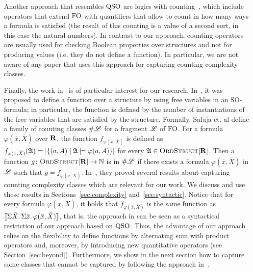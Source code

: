 Another approach that resembles ${\rm QSO}$ are logics with counting~\cite{IL90,E97,GG98,L04}, which include operators that extend ${\rm FO}$ with quantifiers that allow to count in how many ways a formula  is satisfied (the result of this counting is a value of a second sort, in this case the  natural numbers). 
In contrast to our approach, counting operators are usually used for checking Boolean properties over structures and not for producing values (i.e. they do not define a function).
In particular, we are not aware of any paper that uses this approach for capturing counting complexity classes.

Finally, the work in~\cite{SalujaST95,ComptonG96,0001HKV16} is of particular interest for our research. 
In~\cite{SalujaST95}, it was proposed to define a function over a structure by using free variables in an SO-formula; in particular, the function is defined by the number of instantiations of the free variables that are satisfied by the structure.
Formally, Saluja et. al \cite{SalujaST95} define a family of counting classes $\#\mathscr{L}$ for a fragment $\mathscr{L}$ of ${\rm FO}$. For a formula $\varphi(\bar{x},\bar{X})$ over $\mathbf{R}$, the function $f_{\varphi(\bar x, \bar X)}$ is defined as
$
f_{\varphi(\bar x, \bar X)}(\mathfrak{A}) = \vert \{(\bar{a},\bar{A}) \mid \mathfrak{A}\models\varphi(\bar{a},\bar{A})\}\vert
$
for every $\mathfrak{A}\in\text{\sc OrdStruct}[\mathbf{R}]$. Then a function $g\colon \text{\sc OrdStruct}[\mathbf{R}]\to\mathbb{N}$ is in $\#\mathscr{L}$ if there exists a formula $\varphi(\bar{x},\bar{X})$ in $\mathscr{L}$ such that $g = f_{\varphi(\bar x, \bar X)}$.
In~\cite{SalujaST95}, they proved several results about capturing counting complexity classes which are relevant for our work. We discuss and use these results in Sections~\ref{sec:complexity} and~\ref{sec:syntactic}.
Notice that for every formula $\varphi(\bar{x},\bar{X})$, it holds that $f_{\varphi(\bar{x},\bar{X})}$ is the same function as ${\llbracket{}{\Sigma{\bar{X}}.\, \Sigma{\bar{x}}.\, \varphi(\bar{x},\bar{X})}\rrbracket}$, that is, the approach in \cite{SalujaST95} can be seen as a syntactical restriction of our approach based on ${\rm QSO}$. 
Thus, the advantage of our approach relies on the flexibility to define functions by alternating sum with product operators and, moreover, by introducing new quantitative operators (see Section~\ref{sec:beyond}).
Furthermore, we show in the next section how to capture some classes that cannot be captured by following the approach in~\cite{SalujaST95}.
